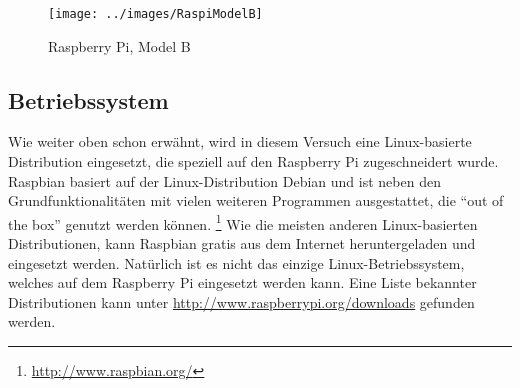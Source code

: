 \begin{figure}[h]
\centering
\texttt{[image: ../images/RaspiModelB]}
\caption{Raspberry Pi, Model B}
\end{figure}

\subsection{Betriebssystem}
Wie weiter oben schon erwähnt, wird in diesem Versuch eine Linux-basierte Distribution eingesetzt, die speziell auf den Raspberry Pi zugeschneidert wurde. Raspbian basiert auf der Linux-Distribution Debian und ist neben den Grundfunktionalitäten mit vielen weiteren Programmen ausgestattet, die ``out of the box'' genutzt werden können.
\footnote{\url{http://www.raspbian.org/}}
Wie die meisten anderen Linux-basierten Distributionen, kann Raspbian gratis aus dem Internet heruntergeladen und eingesetzt werden. Natürlich ist es nicht das einzige Linux-Betriebssystem, welches auf dem Raspberry Pi eingesetzt werden kann. Eine Liste bekannter Distributionen kann unter \url{http://www.raspberrypi.org/downloads} gefunden werden.
